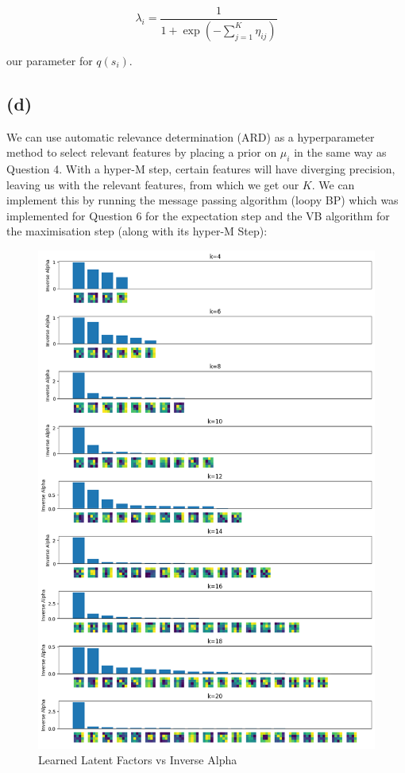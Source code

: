\documentclass[12pt]{article}
\begin{document}
\[\lambda_i = \frac{1}{1+\exp(-\sum_{j=1}^{K} \eta_{ij})}\]

our parameter for $q(s_i)$.


\newpage
\subsection*{(d)}

We can use automatic relevance determination (ARD) as a hyperparameter method to select relevant features by placing a prior on $\mu_i$ in the same way as Question 4. With a hyper-M step, certain features will have diverging precision, leaving us with the relevant features, from which we get our $K$. We can implement this by running the message passing algorithm (loopy BP) which was implemented for Question 6 for the expectation step and the VB algorithm for the maximisation step (along with its hyper-M Step):

\begin{figure}[h]
\centering
\includegraphics[scale=0.4]{outputs/q5/d-latent-factors-comparison}
\caption{Learned Latent Factors vs Inverse Alpha}
\label{fig:}
\end{figure}
\end{document}
